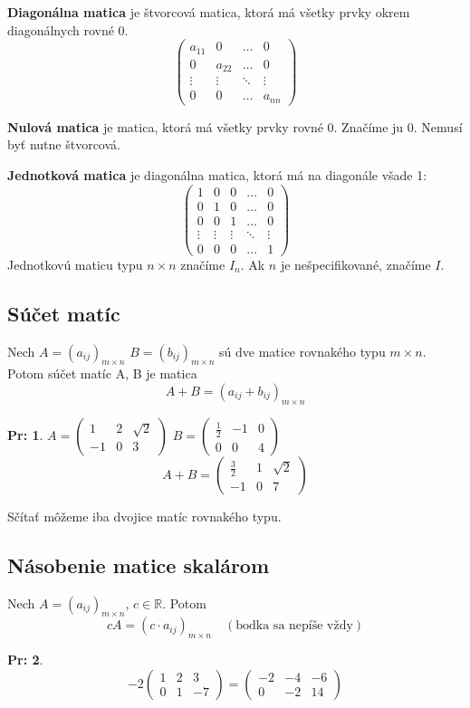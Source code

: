 \documentclass[12pt, a4paper]{article}
\theoremstyle{definition}
\newtheorem*{example}{Pr:}
\begin{document}
\textbf{Diagonálna matica} je štvorcová matica, ktorá má všetky prvky okrem diagonálnych rovné 0.
\[ \begin{pmatrix} a_{11} & 0 & \dots & 0 \\ 0 & a_{22} & \dots & 0 \\ \vdots & \vdots & \ddots & \vdots \\ 0 & 0 & \dots & a_{nn} \end{pmatrix} \]

\textbf{Nulová matica} je matica, ktorá má všetky prvky rovné 0. Značíme ju 0. Nemusí byť nutne štvorcová.

\textbf{Jednotková matica} je diagonálna matica, ktorá má na diagonále všade 1:
\[ \begin{pmatrix} 1 & 0 & 0 & \dots & 0 \\ 0 & 1 & 0 & \dots & 0 \\ 0 & 0 & 1 & \dots & 0 \\ \vdots & \vdots & \vdots & \ddots & \vdots \\ 0 & 0 & 0 & \dots & 1 \end{pmatrix} \]
Jednotkovú maticu typu $n \times n$ značíme $I_n$. Ak $n$ je nešpecifikované, značíme $I$.

\subsection*{Súčet matíc}
Nech $A = (a_{ij})_{m \times n}$
$B = (b_{ij})_{m \times n}$
sú dve matice rovnakého typu $m \times n$. Potom súčet matíc A, B je matica
\[ A + B = (a_{ij} + b_{ij})_{m \times n} \]

\begin{example}
$A = \begin{pmatrix} 1 & 2 & \sqrt{2} \\ -1 & 0 & 3 \end{pmatrix}$ $B = \begin{pmatrix} \frac{1}{2} & -1 & 0 \\ 0 & 0 & 4 \end{pmatrix}$
\[ A + B = \begin{pmatrix} \frac{3}{2} & 1 & \sqrt{2} \\ -1 & 0 & 7 \end{pmatrix} \]
\end{example}
Sčítať môžeme iba dvojice matíc rovnakého typu.

\subsection*{Násobenie matice skalárom}
Nech $A = (a_{ij})_{m \times n}$, $c \in \mathbb{R}$. Potom
\[ c A = (c \cdot a_{ij})_{m \times n} \quad (\text{bodka sa nepíše vždy}) \]
\begin{example}
\[ -2 \begin{pmatrix} 1 & 2 & 3 \\ 0 & 1 & -7 \end{pmatrix} = \begin{pmatrix} -2 & -4 & -6 \\ 0 & -2 & 14 \end{pmatrix} \]
\end{example}
\end{document}

